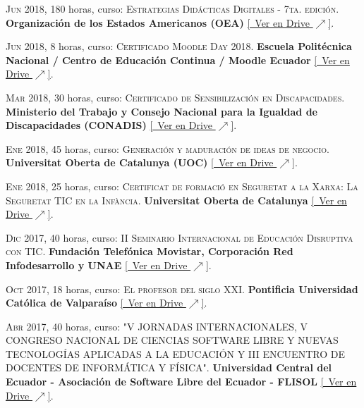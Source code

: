 \documentclass[a4paper]{article}
\begin{document}
\textsc{Jun} 2018, 180 horas, curso: \textsc{Estrategias Didácticas Digitales - 7ta. edición}.
\textbf{Organización de los Estados Americanos (OEA)} \small \href{https://drive.google.com/file/d/1U0ab3bGvQAuYw0n4jltCbKa78J4aOj9r/view}{[\faGoogleDrive~Ver en Drive $\nearrow$]}.

\textsc{Jun} 2018, 8 horas, curso: \textsc{Certificado Moodle Day 2018}.
\textbf{Escuela Politécnica Nacional / Centro de Educación Continua / Moodle Ecuador} \small \href{https://drive.google.com/file/d/1tvhJ7pHdb6Vbgm1ho2VA4CaJUCF2tt_G/view}{[\faGoogleDrive~Ver en Drive $\nearrow$]}.

\textsc{Mar} 2018, 30 horas, curso: \textsc{Certificado de Sensibilización en Discapacidades}.
\textbf{Ministerio del Trabajo y Consejo Nacional para la Igualdad de Discapacidades (CONADIS)} \small \href{https://drive.google.com/file/d/1dPzy2E_s6GhfBuR4mC_IYDbeQSf15JmS/view}{[\faGoogleDrive~Ver en Drive $\nearrow$]}.

\textsc{Ene} 2018, 45 horas, curso: \textsc{Generación y maduración de ideas de negocio}.
\textbf{Universitat Oberta de Catalunya (UOC)} \small \href{https://drive.google.com/file/d/1e5shnM2Pswns_Ylc8s20XMDbsuCRFZry/view}{[\faGoogleDrive~Ver en Drive $\nearrow$]}.

\textsc{Ene} 2018, 25 horas, curso: \textsc{Certificat de formació en Seguretat a la Xarxa: La Seguretat TIC en la Infància}.
\textbf{Universitat Oberta de Catalunya} \small \href{https://drive.google.com/file/d/1okEps1LqT8WAZjFhnPKvGLWeGq25xx_7/view}{[\faGoogleDrive~Ver en Drive $\nearrow$]}.

\textsc{Dic} 2017, 40 horas, curso: \textsc{II Seminario Internacional de Educación Disruptiva con TIC}.
\textbf{Fundación Telefónica Movistar, Corporación Red Infodesarrollo y UNAE} \small \href{https://drive.google.com/file/d/1ox1k6NNQalQov-2WZrHylufk2hnkZDyk/view}{[\faGoogleDrive~Ver en Drive $\nearrow$]}.

\textsc{Oct} 2017, 18 horas, curso: \textsc{El profesor del siglo XXI}.
\textbf{Pontificia Universidad Católica de Valparaíso} \small \href{https://drive.google.com/file/d/1zi4Rbalw5Nt2KkR6VxrBEobCcnIeTXIV/view}{[\faGoogleDrive~Ver en Drive $\nearrow$]}.

\textsc{Abr} 2017, 40 horas, curso: \textsc{"V JORNADAS INTERNACIONALES, V CONGRESO NACIONAL DE CIENCIAS SOFTWARE LIBRE Y NUEVAS TECNOLOGÍAS APLICADAS A LA EDUCACIÓN Y III ENCUENTRO DE DOCENTES DE INFORMÁTICA Y FÍSICA"}.
\textbf{Universidad Central del Ecuador - Asociación de Software Libre del Ecuador - FLISOL} \small \href{https://drive.google.com/file/d/15fWRfyVfDlHKUpB6IijLRmTWuEdYJt7M/view}{[\faGoogleDrive~Ver en Drive $\nearrow$]}.
\end{document}
